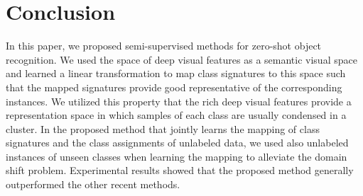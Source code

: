 \documentclass[letterpaper]{article}
\begin{document}
\section{Conclusion} \label{conclusion}
In this paper, we proposed semi-supervised methods for zero-shot object recognition.
We used the space of deep visual features as a semantic visual space and learned a linear transformation to map class signatures to this
space such that the mapped signatures provide good representative of the corresponding instances.
We utilized this property that the rich deep visual features provide a representation space in which samples of each class
are usually condensed in a cluster. In the proposed method that jointly learns the mapping of class signatures and the class assignments of unlabeled data,
we used also unlabeled instances of unseen classes when learning the mapping to alleviate the domain shift problem.
Experimental results showed that the proposed method generally outperformed the other recent methods.
{\small


}
\end{document}
